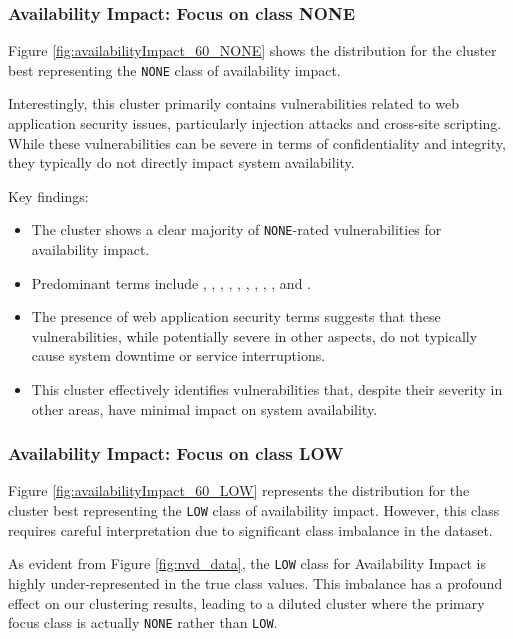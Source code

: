 \documentclass[12pt]{article}
\begin{document}
\subsubsection{Availability Impact: Focus on class NONE}

Figure \ref{fig:availabilityImpact_60_NONE} shows the distribution for the cluster best representing
the \texttt{NONE} class of availability impact.

Interestingly, this cluster primarily contains vulnerabilities related to web application security
issues, particularly injection attacks and cross-site scripting. While these vulnerabilities can be
severe in terms of confidentiality and integrity, they typically do not directly impact system
availability.

Key findings:

\begin{itemize}

	\item The cluster shows a clear majority of \texttt{NONE}-rated vulnerabilities for availability
	      impact.

	\item Predominant terms include , , , , , ,
	      , , , and .

	\item The presence of web application security terms suggests that these vulnerabilities, while
	      potentially severe in other aspects, do not typically cause system downtime or service
	      interruptions.

	\item This cluster effectively identifies vulnerabilities that, despite their severity in other
	      areas, have minimal impact on system availability.

\end{itemize}

\subsubsection{Availability Impact: Focus on class LOW}

Figure \ref{fig:availabilityImpact_60_LOW} represents the distribution for the cluster best
representing the \texttt{LOW} class of availability impact. However, this class requires
careful interpretation due to significant class imbalance in the dataset.

As evident from Figure \ref{fig:nvd_data}, the \texttt{LOW} class for Availability Impact is
highly under-represented in the true class values. This imbalance has a profound effect on our
clustering results, leading to a diluted cluster where the primary focus class is actually
\texttt{NONE} rather than \texttt{LOW}.
\end{document}
